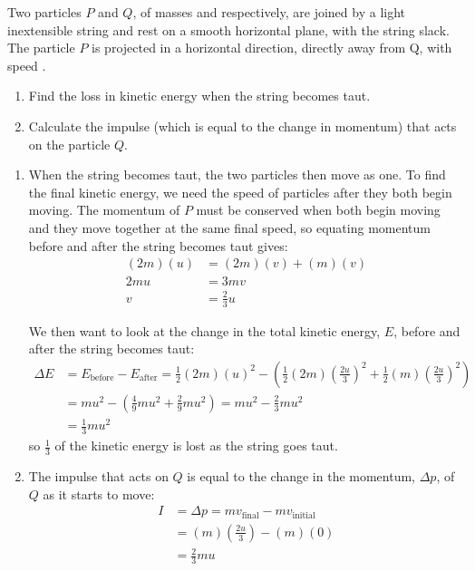 
\begin{problem}[A1986MIIQ1p] %
{Two particles $P$ and $Q$, of masses  and  respectively, are joined by a light inextensible string and rest on a smooth horizontal plane, with the string slack. The particle $P$ is projected in a horizontal direction, directly away from Q, with speed .
\begin{enumerate}
	\item Find the loss in kinetic energy when the string becomes taut.
	\item Calculate the impulse (which is equal to the change in momentum) that acts on the particle $Q$.
\end{enumerate}
}
{}
{\begin{enumerate}
	\item When the string becomes taut, the two particles then move as one. To find the final kinetic energy, we need the speed of particles after they both begin moving. The momentum of $P$ must be conserved when both begin moving and they move together at the same final speed, so equating momentum before and after the string becomes taut gives:
\begin{align*} (2m)(u) &= (2m)(v) + (m)(v) \\ 2mu &= 3mv \\ v &= \frac{2}{3} u \end{align*}

We then want to look at the change in the total kinetic energy, $E$, before and after the string becomes taut:
\begin{align*} \Delta E &=  E_{\textrm{before}} - E_{\textrm{after}} = \frac{1}{2}(2m)(u)^{2} - \left( \frac{1}{2}(2m)\left(\frac{2u}{3}\right)^{2} + \frac{1}{2}(m)\left(\frac{2u}{3}\right)^{2} \right) \\ &= mu^{2} - \left( \frac{4}{9}mu^{2} + \frac{2}{9}mu^{2} \right) = mu^{2} - \frac{2}{3}mu^{2} \\ &= \frac{1}{3}mu^{2}\end{align*}
so $\frac{1}{3}$ of the kinetic energy is lost as the string goes taut.
	\item The impulse that acts on $Q$ is equal to the change in the momentum, $\Delta p$, of $Q$ as it starts to move:
\begin{align*} I &= \Delta p = mv_{\textrm{final}} - mv_{\textrm{initial}}\\ &= (m)\left( \frac{2u}{3} \right) - (m)(0)\\ &= \frac{2}{3}mu \end{align*}
\end{enumerate}
}
\end{problem}